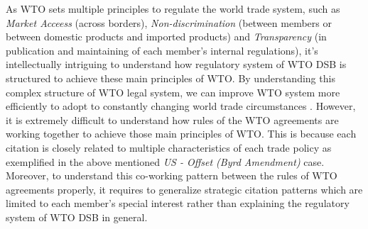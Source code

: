 As WTO sets multiple principles to regulate the world trade system, 
such as \textit{Market Acceess} (across borders), 
\textit{Non-discrimination} (between members 
or between domestic products and imported products) 
and \textit{Transparency} (in publication and maintaining 
of each member's internal regulations), 
it's intellectually intriguing 
to understand how regulatory system of WTO DSB
is structured to achieve these main principles of WTO.
By understanding this complex structure of WTO legal system, 
we can improve WTO system more efficiently 
to adopt to constantly 
changing world trade circumstances
\citep{FREDEBEULKREIN1999625, shaffer_2004, 10.1093/jiel/jgm028}.
However, it is extremely difficult to 
understand how rules of the WTO agreements are
working together to achieve those main principles of WTO. 
This is because each citation is closely related 
to multiple characteristics 
of each trade policy as exemplified in 
the above mentioned \textit{US - Offset (Byrd Amendment)} case. 
Moreover, to understand this co-working pattern between the rules of WTO agreements properly, 
it requires to generalize strategic 
citation patterns which are limited 
to each member's special interest 
rather than explaining the 
regulatory system of WTO DSB in general.


